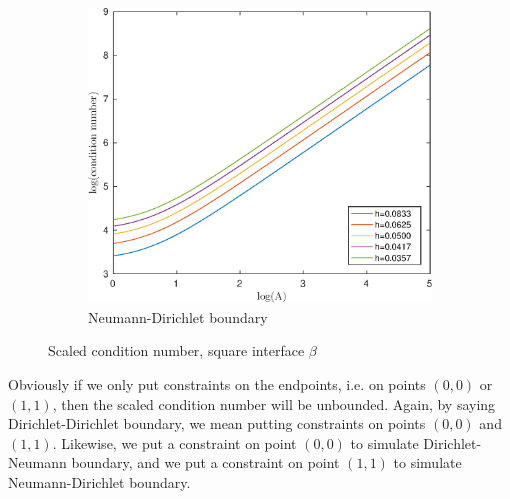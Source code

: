 \documentclass[12pt]{article}
\begin{document}
\begin{figure}[h!]
\vfill
\begin{subfigure}{0.4\textwidth}
\includegraphics[width=\textwidth]{cond-A-2D-circular-ND}
\caption{Neumann-Dirichlet boundary}
\end{subfigure}
\caption{Scaled condition number, square interface $\beta$}
\end{figure}

Obviously if we only put constraints on the endpoints, i.e. on points $(0,0)$ or $(1,1)$, then the scaled condition number will be unbounded. Again, by saying Dirichlet-Dirichlet boundary, we mean putting constraints on  points $(0,0)$ and $(1,1)$. Likewise, we put a constraint on point $(0,0)$ to simulate Dirichlet-Neumann boundary, and we put a constraint on point $(1,1)$ to simulate Neumann-Dirichlet boundary.
\end{document}
